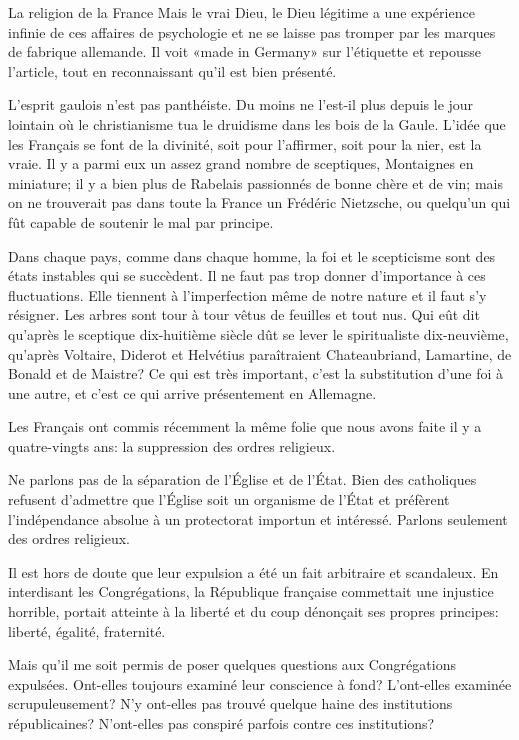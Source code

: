 \begin{chapter}{La religion de la France}
Mais le vrai Dieu, le Dieu légitime a une expérience infinie de ces
affaires de psychologie et ne se laisse pas tromper par les marques de
fabrique allemande. Il voit «made in Germany» sur l'étiquette et
repousse l'article, tout en reconnaissant qu'il est bien présenté.

\horizontalLine

L'esprit gaulois n'est pas panthéiste. Du moins ne l'est-il plus depuis
le jour lointain où le christianisme tua le druidisme dans les bois de
la Gaule. L'idée que les Français se font de la divinité, soit pour
l'affirmer, soit pour la nier, est la vraie. Il y a parmi eux un assez
grand nombre de sceptiques, Montaignes en miniature; il y a bien plus de
Rabelais passionnés de bonne chère et de vin; mais on ne trouverait pas
dans toute la France un Frédéric Nietzsche, ou quelqu'un qui fût capable
de soutenir le mal par principe.

Dans chaque pays, comme dans chaque homme, la foi et le scepticisme sont
des états instables qui se succèdent. Il ne faut pas trop donner
d'importance à ces fluctuations. Elle tiennent à l'imperfection même de
notre nature et il faut s'y résigner. Les arbres sont tour à tour vêtus
de feuilles et tout nus. Qui eût dit qu'après le sceptique dix-huitième
siècle dût se lever le spiritualiste dix-neuvième, qu'après Voltaire,
Diderot et Helvétius paraîtraient Chateaubriand, Lamartine, de Bonald et
de Maistre? Ce qui est très important, c'est la substitution d'une foi à
une autre, et c'est ce qui arrive présentement en Allemagne.

Les Français ont commis récemment la même folie que nous avons faite il
y a quatre-vingts ans: la suppression des ordres religieux.

Ne parlons pas de la séparation de l'Église et de l'État. Bien des
catholiques refusent d'admettre que l'Église soit un organisme de l'État
et préfèrent l'indépendance absolue à un protectorat importun et
intéressé. Parlons seulement des ordres religieux.

Il est hors de doute que leur expulsion a été un fait arbitraire et
scandaleux. En interdisant les Congrégations, la République française
commettait une injustice horrible, portait atteinte à la liberté et du
coup dénonçait ses propres principes: liberté, égalité, fraternité.

Mais qu'il me soit permis de poser quelques questions aux Congrégations
expulsées. Ont-elles toujours examiné leur conscience à fond?
L'ont-elles examinée scrupuleusement? N'y ont-elles pas trouvé quelque
haine des institutions républicaines? N'ont-elles pas conspiré parfois
contre ces institutions?


\end{chapter}
